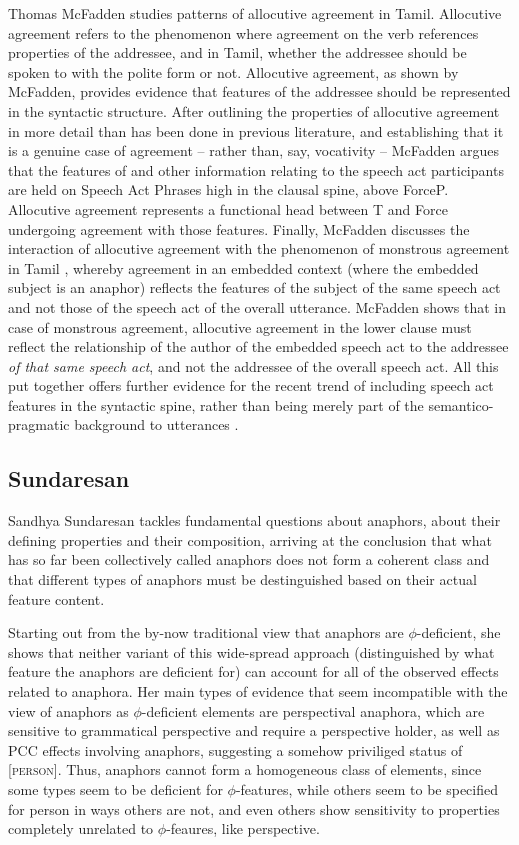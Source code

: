 \documentclass[output=paper
,modfonts
,nonflat]{langsci/langscibook}
\begin{document}
Thomas McFadden studies patterns of allocutive agreement in Tamil.
Allocutive agreement refers to the phenomenon where agreement on the verb references properties of the addressee, and in Tamil, whether the addressee should be spoken to with the polite form or not.
Allocutive agreement, as shown by McFadden, provides evidence that features of the addressee should be represented in the syntactic structure.
After outlining the properties of allocutive agreement in more detail than has been done in previous literature, and establishing that it is a genuine case of agreement -- rather than, say, vocativity -- McFadden argues that the features of and other information relating to the speech act participants are held on Speech Act Phrases high in the clausal spine, above ForceP.
Allocutive agreement represents a functional head between T and Force undergoing agreement with those features.
Finally, McFadden discusses the interaction of allocutive agreement with the phenomenon of monstrous agreement in Tamil \citep{sundaresan2012}, whereby agreement in an embedded context (where the embedded subject is an anaphor) reflects the features of the subject of the same speech act and not those of the speech act of the overall utterance.
McFadden shows that in case of monstrous agreement, allocutive agreement in the lower clause must reflect the relationship of the author of the embedded speech act to the addressee \emph{of that same speech act}, and not the addressee of the overall speech act.
All this put together offers further evidence for the recent trend of including speech act features in the syntactic spine, rather than being merely part of the semantico-pragmatic background to utterances \citep{HaegemanHill2013,zu2015,Miyagawa2017}.

\subsection{Sundaresan}
\label{sec:sundaresan}

Sandhya Sundaresan tackles fundamental questions about anaphors, about their defining properties and their composition, arriving at the conclusion that what has so far been collectively called anaphors does not form a coherent class and that different types of anaphors must be destinguished based on their actual feature content.

Starting out from the by-now traditional view that anaphors are $\phi$-deficient, she shows that neither variant of this wide-spread approach (distinguished by what feature the anaphors are deficient for) can account for all of the observed effects related to anaphora. Her main types of evidence that seem incompatible with the view of anaphors as $\phi$-deficient elements are perspectival anaphora, which are sensitive to grammatical perspective and require a perspective holder, as well as PCC effects involving anaphors, suggesting a somehow priviliged status of [\textsc{person}]. Thus, anaphors cannot form a homogeneous class of elements, since some types seem to be deficient for $\phi$-features, while others seem to be specified for person in ways others are not, and even others show sensitivity to properties completely unrelated to $\phi$-feaures, like perspective.
\end{document}
